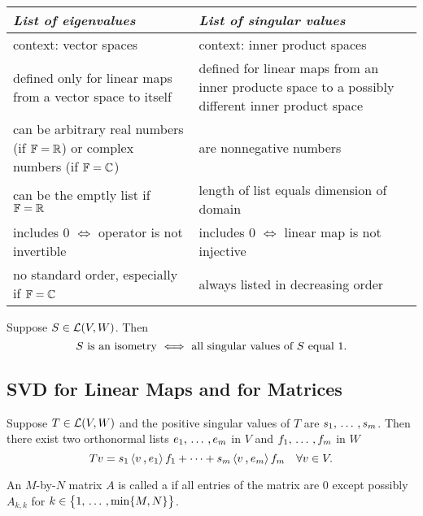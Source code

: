 \begin{tabular}{|p{}|p{}|}
  \hline
  \emph{List of eigenvalues} & \emph{List of singular values} \\
  \hline
  context: vector spaces & context: inner product spaces \\
  \hline
  defined only for linear maps from a vector space to itself & defined for linear maps from an inner producte space to a possibly different inner product space \\
  \hline
  can be arbitrary real numbers (if $\mathbb{F} = \mathbb{R}$) or complex numbers (if $\mathbb{F}=\mathbb{C}$) & are nonnegative numbers \\
  \hline
  can be the emptly list if $\mathbb{F} = \mathbb{R}$ & length of list equals dimension of domain \\
  \hline
  includes $0$ $\iff$ operator is not invertible & includes $0$ $\iff$ linear map is not injective \\
  \hline
  no standard order, especially if $\mathbb{F} = \mathbb{C}$ & always listed in decreasing order \\
  \hline
\end{tabular}

\begin{thm}
  \label{thm: isometries characterized by having all singular a values equal 1}
  Suppose $S \in \mathcal{L} (V,W)$. Then
  \[
    S$ is an isometry $ \iff $ all singular values of $S$ equal $1.
  \]
\end{thm}

\subsection{SVD for Linear Maps and for Matrices}

\begin{thm}
  Suppose $T\in \mathcal{L} (V,W)$ and the positive singular values of $T$ are $s_1, {\, \ldots \,\,}, s_m$. Then there exist two orthonormal lists $e_1, {\, \ldots \,\,}, e_m$ in $V$ and $f_1, {\, \ldots \,\,}, f_m$ in $W$ \st
  \[
    Tv = s_1 \ip{v}{e_1} f_1 + \cdots + s_m \ip{v}{e_m}f_m \quad \forall v \in V.
  \]
\end{thm}

\begin{mydef}
  An $M$-by-$N$ matrix $A$ is called a  if all entries of the matrix are $0$ except possibly $A_{k,k}$ for $k \in \big\{1, {\, \ldots \,\,}, \operatorname{min} \{M,N\} \big \}$.
\end{mydef}

